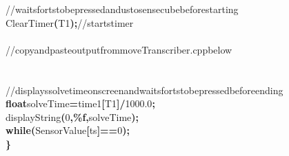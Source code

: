 \documentclass[a4paper, 10pt]{article}
\newcommand\SPC{\hspace*{0.6em}}
\newcommand\TAB{\hspace*{1.2em}}
\newcommand\QOT{\mbox{\char 34}}
\newcommand{\CppAComment}[1]{\textcolor[rgb]{0,0.5,0}{\colorbox[rgb]{1,1,1}{#1}}}
\newcommand{\CppAFloat}[1]{\textcolor[rgb]{0.5,0,0.5}{#1}}
\newcommand{\CppAIdentifier}[1]{#1}
\newcommand{\CppANumber}[1]{\textcolor[rgb]{0,0,1}{\colorbox[rgb]{1,1,1}{#1}}}
\newcommand{\CppAReservedWord}[1]{\textbf{\colorbox[rgb]{1,1,1}{#1}}}
\newcommand{\CppASpace}[1]{\colorbox[rgb]{1,1,1}{#1}}
\newcommand{\CppAString}[1]{\textbf{\textcolor[rgb]{0.5,0,0}{\colorbox[rgb]{1,1,1}{#1}}}}
\newcommand{\CppASymbol}[1]{\textbf{\textcolor[rgb]{1,0,0}{\colorbox[rgb]{1,1,1}{#1}}}}
\begin{document}
\begin{ttfamily}
\CppASpace{\TAB }\CppAComment{//\SPC waits\SPC for\SPC ts\SPC to\SPC be\SPC pressed\SPC and\SPC us\SPC to\SPC sense\SPC cube\SPC before\SPC starting}\\
\CppASpace{\TAB }\CppAIdentifier{ClearTimer}\CppASymbol{(}\CppAIdentifier{T1}\CppASymbol{)}\CppASymbol{;}\CppASpace{\SPC }\CppAComment{//\SPC starts\SPC timer}\\
\\
\CppASpace{\TAB }\CppAComment{//copy\SPC and\SPC paste\SPC output\SPC from\SPC moveTranscriber.cpp\SPC below}\\
\\
\CppASpace{\TAB }\\
\CppASpace{\TAB }\CppAComment{//\SPC displays\SPC solve\SPC time\SPC on\SPC screen\SPC and\SPC waits\SPC for\SPC ts\SPC to\SPC be\SPC pressed\SPC before\SPC ending}\\
\CppASpace{\TAB }\CppAReservedWord{float}\CppASpace{\SPC }\CppAIdentifier{solveTime}\CppASymbol{=}\CppAIdentifier{time1}\CppASymbol{[}\CppAIdentifier{T1}\CppASymbol{]}\CppASymbol{/}\CppAFloat{1000.0}\CppASymbol{;}\\
\CppASpace{\TAB }\CppAIdentifier{displayString}\CppASymbol{(}\CppANumber{0}\CppASymbol{,}\CppAString{\QOT \%f\QOT }\CppASymbol{,}\CppAIdentifier{solveTime}\CppASymbol{)}\CppASymbol{;}\\
\CppASpace{\TAB }\CppAReservedWord{while}\CppASpace{\SPC }\CppASymbol{(}\CppAIdentifier{SensorValue}\CppASymbol{[}\CppAIdentifier{ts}\CppASymbol{]}\CppASymbol{==}\CppANumber{0}\CppASymbol{)}\CppASymbol{;}\\
\CppASymbol{\}}\\

\end{ttfamily}
\end{document}
